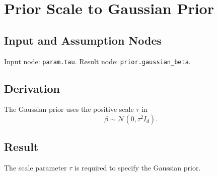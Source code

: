 \section{Prior Scale to Gaussian Prior}
\label{edge:tau-to-gaussian-prior}

\subsection{Input and Assumption Nodes}
Input node: \texttt{param.tau}. Result node: \texttt{prior.gaussian\_beta}.

\subsection{Derivation}
The Gaussian prior uses the positive scale \(\tau\) in
\[
  \beta \sim \mathcal{N}(0,\tau^2 I_d).
\]

\subsection{Result}
The scale parameter \(\tau\) is required to specify the Gaussian prior.
